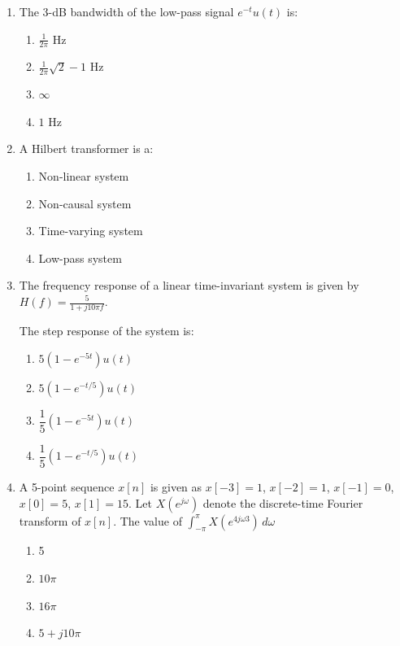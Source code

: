 \documentclass[journal,12pt,onecolumn]{IEEEtran}
\theoremstyle{remark}
\begin{document}
\begin{enumerate}
\item The 3-dB bandwidth of the low-pass signal $e^{-t}u(t)$ is: 
\hfill{}
\begin{multicols}{4}
\begin{enumerate}
  \item $\frac{1}{2\pi}$ Hz
  \item $\frac{1}{2\pi}\sqrt{2}-1$ Hz
  \item $\infty$
  \item $1$ Hz
\end{enumerate}
\end{multicols}

\item A Hilbert transformer is a: 
\hfill{}
\begin{enumerate}

  \item Non-linear system
  \item Non-causal system
  \item Time-varying system
  \item Low-pass system
\end{enumerate}

\item The frequency response of a linear time-invariant system is given by
$
H(f)=\frac{5}{1+j10\pi f}.
$

The step response of the system is: 
\hfill{}
\begin{multicols}{2}
\begin{enumerate}
  \item $5\left(1-e^{-5t}\right)u(t)$
  \item $5\left(1-e^{-t/5}\right)u(t)$
  \item $\dfrac{1}{5}\left(1-e^{-5t}\right)u(t)$
  \item $\dfrac{1}{5}\left(1-e^{-t/5}\right)u(t)$
\end{enumerate}
\end{multicols}

\item
A 5-point sequence $x[n]$ is given as $x[-3]=1$, $x[-2]=1$, $x[-1]=0$,\\
$x[0]=5$, $x[1]=15$. Let $X\left(e^{j\omega}\right)$ denote the discrete-time Fourier\\
transform of $x[n]$. The value of
$
\int_{-\pi}^{\pi} X\left(e^{4j\omega3}\right)\, d\omega
$
\hfill{}
\begin{multicols}{4}
\begin{enumerate}
  \item 5
  \item $10\pi$
  \item $16\pi$
  \item $5 + j10\pi$
\end{enumerate}
\end{multicols}


\end{enumerate}
\end{document}
